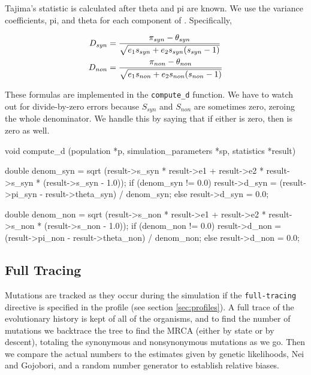 \documentclass{article}
\begin{document}
      Tajima's \D{} statistic is calculated after theta and pi are known. We use
      the variance coefficients, pi, and theta for each component of \D{}.
      Specifically,

      \begin{align*}
	D_{syn} & = {\pi_{syn} - \theta_{syn} \over
		     \sqrt{e_1 s_{syn} + e_2 s_{syn} (s_{syn} - 1)}} \\ %
	D_{non} & = {\pi_{non} - \theta_{non} \over
		     \sqrt{e_1 s_{non} + e_2 s_{non} (s_{non} - 1)}}
      \end{align*}

      These formulas are implemented in the \verb|compute_d| function. We have
      to watch out for divide-by-zero errors because $S_{syn}$ and $S_{non}$ are
      sometimes zero, zeroing the whole denominator. We handle this by saying
      that if either is zero, then \D{} is zero as well.

\begin{ccode}
void compute_d (population *p, simulation_parameters *sp, statistics *result) {
  double denom_syn = sqrt (result->s_syn * result->e1 + result->e2 * result->s_syn *
							(result->s_syn - 1.0));
  if (denom_syn != 0.0)
    result->d_syn = (result->pi_syn - result->theta_syn) / denom_syn;
  else
    result->d_syn = 0.0;

  double denom_non = sqrt (result->s_non * result->e1 + result->e2 * result->s_non *
							(result->s_non - 1.0));
  if (denom_non != 0.0)
    result->d_non = (result->pi_non - result->theta_non) / denom_non;
  else
    result->d_non = 0.0;
}
\end{ccode}

    \subsection{Full Tracing}
      \label{sec:full-tracing}

      Mutations are tracked as they occur during the simulation if the
      \verb|full-tracing| directive is specified in the profile (see section
	  \ref{sec:profiles}). A full trace of the evolutionary history is
      kept of all of the organisms, and to find the number of mutations we
      backtrace the tree to find the MRCA (either by state or by descent),
      totaling the synonymous and nonsynonymous mutations as we go. Then we
      compare the actual numbers to the estimates given by genetic likelihoods,
      Nei and Gojobori, and a random number generator to establish relative
      biases.
\end{document}
